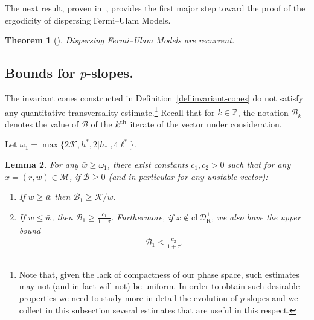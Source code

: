 \documentclass[10pt]{amsart}
\newtheorem{theo}{Theorem}[section]
\newtheorem{lemm}[theo]{Lemma}\newtheorem{prop}[theo]{Proposition}\newtheorem{coro}[theo]{Corollary}\newtheorem{conj}[theo]{Conjecture}
\theoremstyle{definition}\newtheorem{defi}[theo]{Definition}\newtheorem{rema}[theo]{Remark}\newtheorem{exam}[theo]{Example}\newtheorem{exem}[theo]{Example}\newtheorem{nota}[theo]{Notation}
\newcommand{\nin}{\not\in}
\newcommand{\ct}{r}
\newcommand{\cl}[1]{\mathrm{cl}\,#1}
\newcommand{\integers}{\mathbb{Z}}
\newcommand{\cB}{\mathcal{B}}
\newcommand{\cK}{\mathcal{K}}
\newcommand{\pslope}{\mathcal{B}}
\newcommand{\cell}{\mathcal{D}}
\newcommand{\csp}{\mathcal{M}}
\newcommand{\privateu}[1]{#1^*}
\newcommand{\privatel}[1]{#1_*}
\newcommand{\slope}{h}
\newcommand{\slopeu}{\privateu{\slope}}
\newcommand{\slopel}{\privatel{\slope}}
\newcommand{\ellu}{\privateu{\ell}}
\newcommand{\recoPrivate}{\mathrm{R}}
\newcommand{\backReco}{{\cell^+_{\recoPrivate}}}
\newcommand{\ppPrivate}[2]{#1^{#2}}
\newcommand{\prePrivate}[1]{\ppPrivate{#1}{-}}
\newcommand{\prpslope}{\prePrivate{\pslope}}
\newcommand{\llw}{\stackunder[1.2pt]{$w$}{\rule{.8ex}{.075ex}}}
\newcommand{\law}[1]{\omega_{#1}}
\newcommand*\DS{\displaystyle}
\renewcommand{\prpslope}{\cB}
\renewcommand{\llw}{\law{1}}
\renewcommand{\prpslope}{\cB}
\renewcommand{\prpslope}{\cB}
\newcommand*{\relabel}{\renewcommand{\labelenumi}{(\theenumi)}}
\newcommand*{\alphenumi}{\renewcommand*{\theenumi}{\alph{enumi}}\relabel}
\begin{document}
The next result, proven in~\cite{fum}, provides the first major step toward the proof of the ergodicity of dispersing Fermi--Ulam Models.
\begin{theo}[{\cite[Theorem~4]{fum}}]\label{ThRec}
Dispersing Fermi--Ulam Models are recurrent.
\end{theo}

\subsection{Bounds for \texorpdfstring{$p$}{p}-slopes.} The invariant cones constructed in Definition~\ref{def:invariant-cones} do not satisfy any quantitative transversality estimate.\footnote{Note that, given the lack of compactness of our phase space, such estimates may not (and in fact will not) be uniform. In order to obtain such desirable properties we need to study more in detail the evolution of $p$-slopes and we collect in this subsection several estimates that are useful in this respect.} Recall that for $k\in\integers$, the notation $\prpslope_k$ denotes the value of $\prpslope$ of the $k^{\rm th}$ iterate of the vector under consideration.

Let $\llw = \max\{2\cK,\slopeu,2|\slopel|,4\ellu\}$.

\begin{lemm}\label{LmPSlopeC0}
For any $\bar w\ge \llw$, there exist constants $c_1, c_2 > 0$ such that for any $x = (\ct,w)\in \csp$, if $\prpslope\ge 0$ (and in particular for any unstable vector):
\begin{enumerate}\alphenumi
\item\label{lemm4.12.1} If $w\geq \bar w$ then $\prpslope_{1}\geq \cK/w$.
\item\label{lemm4.12.2} If $w\leq \bar w$, then $\DS
\prpslope_1\geq \frac{c_1}{1+\tau}. $ Furthermore, if $x\nin\cl\backReco$, we also have the upper bound
\begin{align*}
\prpslope_{1}\leq \frac{c_2}{1+\tau}.
\end{align*}
\end{enumerate}
\end{lemm}
\end{document}
